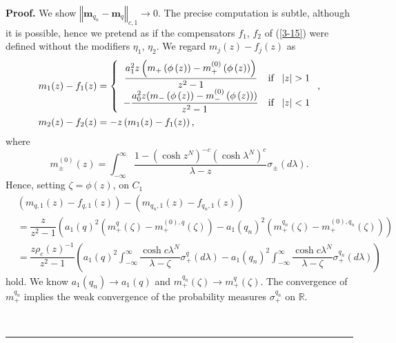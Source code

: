 \documentclass[a4paper]{article}%
\newenvironment{proof}[1][Proof]{\noindent\textbf{#1.} }{\ \rule{0.5em}{0.5em}}
\begin{document}
\begin{proof}
We show $\left\Vert \boldsymbol{m}_{q_{n}}-\boldsymbol{m}_{q}\right\Vert
_{c,1}\rightarrow0$. The precise computation is subtle, although it is
possible, hence we pretend as if the compensators $f_{1}$, $f_{2}$ of
(\ref{3-15}) were defined without the modifiers $\eta_{1}$, $\eta_{2}$. We
regard $m_{j}\left(  z\right)  -f_{j}(z)$ as%
\begin{align*}
m_{1}(z)-f_{1}(z)  &  =\left\{
\begin{array}
[c]{cc}%
\dfrac{a_{1}^{2}z\left(  m_{+}\left(  \phi\left(  z\right)  \right)
-m_{+}^{\left(  0\right)  }\left(  \phi\left(  z\right)  \right)  \right)
}{z^{2}-1} & \text{if \ }\left\vert z\right\vert >1\\
-\dfrac{a_{0}^{2}z(m_{-}\left(  \phi\left(  z\right)  \right)  -m_{-}^{\left(
0\right)  }\left(  \phi\left(  z\right)  \right)  )}{z^{2}-1} & \text{if
\ }\left\vert z\right\vert <1
\end{array}
\right.  \text{,}\\
m_{2}(z)-f_{2}(z)  &  =-z\left(  m_{1}(z)-f_{1}(z)\right)  \text{,}%
\end{align*}
where%
\[
m_{\pm}^{\left(  0\right)  }\left(  z\right)  =\int_{-\infty}^{\infty}%
\dfrac{1-\left(  \cosh z^{N}\right)  ^{-c}\left(  \cosh\lambda^{N}\right)
^{c}}{\lambda-z}\sigma_{\pm}\left(  d\lambda\right)  \text{.}%
\]
Hence, setting $\zeta=\phi\left(  z\right)  $, on $C_{1}$%
\begin{align}
&  \left(  m_{q,1}(z)-f_{q,1}(z)\right)  -\left(  m_{q_{n},1}(z)-f_{q_{n}%
,1}(z)\right) \nonumber\\
&  =\dfrac{z}{z^{2}-1}\left(  a_{1}\left(  q\right)  ^{2}\left(  m_{+}%
^{q}\left(  \zeta\right)  -m_{+}^{\left(  0\right)  ,q}\left(  \zeta\right)
\right)  -a_{1}\left(  q_{n}\right)  ^{2}\left(  m_{+}^{q_{n}}\left(
\zeta\right)  -m_{+}^{\left(  0\right)  ,q_{n}}\left(  \zeta\right)  \right)
\right) \nonumber\\
&  =\dfrac{z\rho_{c}(z)^{-1}}{z^{2}-1}\left(  a_{1}\left(  q\right)  ^{2}%
\int_{-\infty}^{\infty}\dfrac{\cosh c\lambda^{N}}{\lambda-\zeta}\sigma_{+}%
^{q}\left(  d\lambda\right)  -a_{1}\left(  q_{n}\right)  ^{2}\int_{-\infty
}^{\infty}\dfrac{\cosh c\lambda^{N}}{\lambda-\zeta}\sigma_{+}^{q_{n}}\left(
d\lambda\right)  \right)  \label{4-4}%
\end{align}
hold. We know $a_{1}\left(  q_{n}\right)  \rightarrow a_{1}\left(  q\right)  $
and $m_{+}^{q_{n}}\left(  \zeta\right)  \rightarrow m_{+}^{q}\left(
\zeta\right)  $. The convergence of $m_{+}^{q_{n}}$ implies the weak
convergence of the probability measures $\sigma_{+}^{q_{n}}$ on $\mathbb{R}$.

\end{proof}
\end{document}
